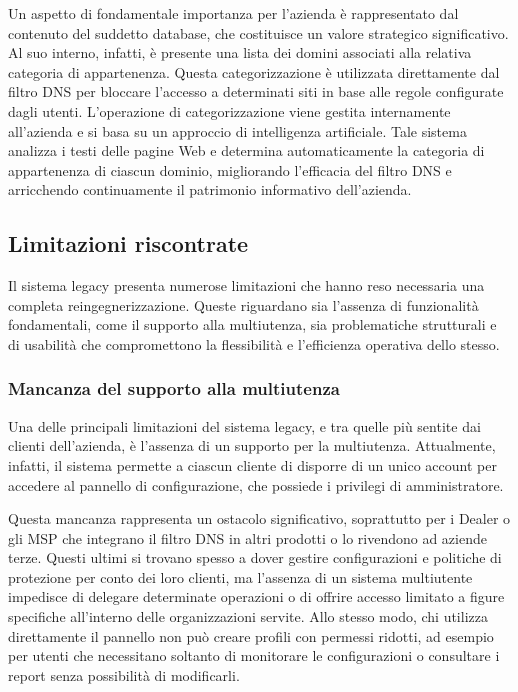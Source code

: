 Un aspetto di fondamentale importanza per l'azienda è rappresentato dal contenuto del suddetto database, che costituisce un valore strategico significativo. Al suo interno, infatti, è presente una lista dei domini associati alla relativa categoria di appartenenza. Questa categorizzazione è utilizzata direttamente dal filtro DNS per bloccare l'accesso a determinati siti in base alle regole configurate dagli utenti. L'operazione di categorizzazione viene gestita internamente all'azienda e si basa su un approccio di intelligenza artificiale. Tale sistema analizza i testi delle pagine Web e determina automaticamente la categoria di appartenenza di ciascun dominio, migliorando l'efficacia del filtro DNS e arricchendo continuamente il patrimonio informativo dell'azienda.

\subsection{Limitazioni riscontrate}
Il sistema legacy presenta numerose limitazioni che hanno reso necessaria una completa reingegnerizzazione. Queste riguardano sia l’assenza di funzionalità fondamentali, come il supporto alla multiutenza, sia problematiche strutturali e di usabilità che compromettono la flessibilità e l’efficienza operativa dello stesso.

\subsubsection{Mancanza del supporto alla multiutenza}
Una delle principali limitazioni del sistema legacy, e tra quelle più sentite dai clienti dell'azienda, è l’assenza di un supporto per la multiutenza. Attualmente, infatti, il sistema permette a ciascun cliente di disporre di un unico account per accedere al pannello di configurazione, che possiede i privilegi di amministratore.

Questa mancanza rappresenta un ostacolo significativo, soprattutto per i Dealer o gli MSP che integrano il filtro DNS in altri prodotti o lo rivendono ad aziende terze. Questi ultimi si trovano spesso a dover gestire configurazioni e politiche di protezione per conto dei loro clienti, ma l'assenza di un sistema multiutente impedisce di delegare determinate operazioni o di offrire accesso limitato a figure specifiche all’interno delle organizzazioni servite. Allo stesso modo, chi utilizza direttamente il pannello non può creare profili con permessi ridotti, ad esempio per utenti che necessitano soltanto di monitorare le configurazioni o consultare i report senza possibilità di modificarli.

